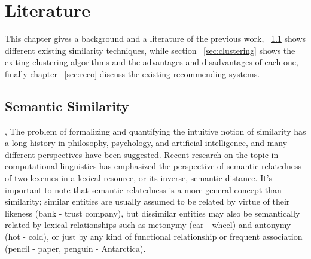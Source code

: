 
\chapter{Literature} %

\label{literature} %


This chapter gives a background and a literature of the previous work, ~\ref{sec:sim} shows different existing similarity techniques, while section ~\ref{sec:clustering}  shows the exiting clustering algorithms and the advantages and disadvantages of each one, finally chapter ~\ref{sec:reco} discuss the existing recommending systems.
\section{Semantic Similarity}\label{sec:sim}, 
The problem of formalizing and quantifying the intuitive notion of similarity has a long history in philosophy, psychology, and artificial intelligence, and many different perspectives have been suggested. Recent research on the topic in computational linguistics has emphasized the perspective of semantic relatedness of two lexemes in a lexical resource, or its inverse, semantic distance. It’s important to note that semantic relatedness is a more general concept than similarity; similar entities are usually assumed to be related by virtue of their likeness (bank - trust company), but dissimilar entities may also be semantically related by lexical relationships such as metonymy (car - wheel) and antonymy (hot - cold), or just by any kind of functional relationship or frequent association (pencil - paper, penguin - Antarctica).\\

